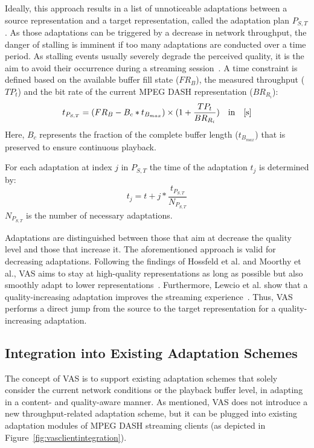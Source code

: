 Ideally, this approach results in a list of unnoticeable adaptations between a source representation and a target representation, called the adaptation plan $P_{S,T}$.
As those adaptations can be triggered by a decrease in network throughput, the danger of stalling is imminent if too many adaptations are conducted over a time period.
As stalling events usually severely degrade the perceived quality, it is the aim to avoid their occurrence during a streaming session~\cite{VanKester2011}.
A time constraint is defined based on the available buffer fill state ($FR_{B}$), the measured throughput ($TP_{t}$) and the bit rate of the current \ac{MPEG} \ac{DASH} representation ($BR_{R_i}$):
\begin{equation}
t_{P_{S,T}} = (FR_{B} - B_{c} * t_{B_{max}}) \times (1+\frac{TP_{t}}{BR_{R_i}}) \quad \mbox{in\quad [s]}
\end{equation}
Here, $B_{c}$ represents the fraction of the complete buffer length ($t_{B_{max}}$) that is preserved to ensure continuous playback.

For each adaptation at index $j$ in $P_{S,T}$ the time of the adaptation $t_j$ is determined by:
\begin{equation}
t_j = t + j * \frac{t_{P_{S,T}}}{N_{P_{S,T}}}
\end{equation}
$N_{P_{S,T}}$ is the number of necessary adaptations.

Adaptations are distinguished between those that aim at decrease the quality level and those that increase it.
The aforementioned approach is valid for decreasing adaptations.
Following the findings of Hossfeld et al. and Moorthy et al., \ac{VAS} aims to stay at high-quality representations as long as possible but also smoothly adapt to lower representations~\cite{Hossfeld2014,Moorthy2012}.
Furthermore, Lewcio et al. show that a quality-increasing adaptation improves the streaming experience~\cite{Lewcio2011}.
Thus, \ac{VAS} performs a direct jump from the source to the target representation for a quality-increasing adaptation.
\subsection{Integration into Existing Adaptation Schemes}
\label{sec:726_adaptation_strategies}
The concept of \ac{VAS} is to support existing adaptation schemes that solely consider the current network conditions or the playback buffer level, in adapting in a content- and quality-aware manner.
As mentioned, \ac{VAS} does not introduce a new throughput-related adaptation scheme, but it can be plugged into existing adaptation modules of \ac{MPEG} \ac{DASH} streaming clients (as depicted in Figure~\ref{fig:vasclientintegration}).

